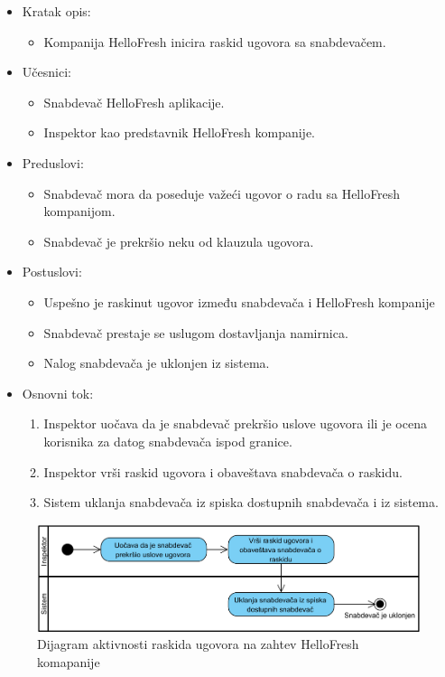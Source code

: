 \begin{itemize}
    \item Kratak opis:
        \begin{itemize}
            \item Kompanija HelloFresh inicira raskid ugovora sa snabdevačem.
        \end{itemize}
    \item Učesnici:
        \begin{itemize}
            \item Snabdevač HelloFresh aplikacije.
            \item Inspektor kao predstavnik HelloFresh kompanije.
        \end{itemize}
    \item Preduslovi:
        \begin{itemize}
            \item Snabdevač mora da poseduje važeći ugovor o radu sa HelloFresh kompanijom.
            \item Snabdevač je prekršio neku od klauzula ugovora.
        \end{itemize}
    \item Postuslovi:
        \begin{itemize}
            \item Uspešno je raskinut ugovor između snabdevača i HelloFresh kompanije
            \item Snabdevač prestaje se uslugom dostavljanja namirnica.
            \item Nalog snabdevača je uklonjen iz sistema.
        \end{itemize}
    \item Osnovni tok:
        \begin{enumerate}
            \item Inspektor uočava da je snabdevač prekršio uslove ugovora ili je ocena korisnika za datog snabdevača ispod granice.
            \item Inspektor vrši raskid ugovora i obaveštava snabdevača o raskidu.
            \item Sistem uklanja snabdevača iz spiska dostupnih snabdevača i iz sistema.
        \end{enumerate}
\end{itemize}

\begin{figure}[H]
\begin{center}
\includegraphics[width=\textwidth]{Pictures/activity_supplier_contract_termination_2.png}
\end{center}
    \caption{Dijagram aktivnosti raskida ugovora na zahtev HelloFresh komapanije}
\label{fig:ActivitySupplierContractTermination2}
\end{figure}